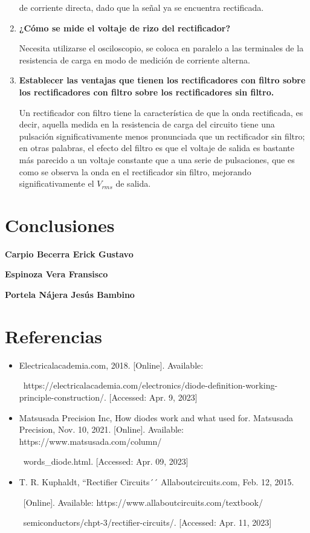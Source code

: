 \documentclass[12pt]{article}
\begin{document}
\begin{enumerate}
                de corriente directa, dado que la señal ya se encuentra rectificada.
            \item \textbf{¿Cómo se mide el voltaje de rizo del rectificador?}\par
                Necesita utilizarse el osciloscopio, se coloca en paralelo a las terminales de la resistencia de carga en modo de medición de corriente alterna.
            \item \textbf{Establecer las ventajas que tienen los rectificadores con filtro sobre los rectificadores con filtro sobre los rectificadores sin filtro.}\par    
                Un rectificador con filtro tiene la característica de que la onda rectificada, es decir, aquella medida en la resistencia de carga del circuito tiene una pulsación significativamente menos 
                pronunciada que un rectificador sin filtro; en otras palabras, el efecto del filtro es que el voltaje de salida es bastante más parecido a un voltaje constante que a una serie de pulsaciones, que 
                es como se observa la onda en el rectificador sin filtro, mejorando significativamente el $V_{rms}$ de salida.
        \end{enumerate}

        \section*{Conclusiones}
        \label{sec:conclusiones}
        \textbf{Carpio Becerra Erick Gustavo}\par
        \textbf{Espinoza Vera Fransisco}\par
        \textbf{Portela Nájera Jesús Bambino}\par

        \section*{Referencias}
        \label{sec:referencias}
        \begin{itemize}
            \item Electricalacademia.com, 2018. [Online]. Available:\par\ https://electricalacademia.com/electronics/diode-definition-working-principle-construction/. [Accessed: Apr. 9, 2023]
            \item Matsusada Precision Inc, How diodes work and what used for. Matsusada Precision, Nov. 10, 2021. [Online]. Available: https://www.matsusada.com/column/\par\ words\_diode.html. [Accessed: Apr. 09, 2023]
            \item T. R. Kuphaldt, ``Rectifier Circuits´´ Allaboutcircuits.com, Feb. 12, 2015. \par\ [Online]. Available: https://www.allaboutcircuits.com/textbook/\par\ semiconductors/chpt-3/rectifier-circuits/. [Accessed: Apr. 11, 2023]
        \end{itemize}
        
\end{document}
